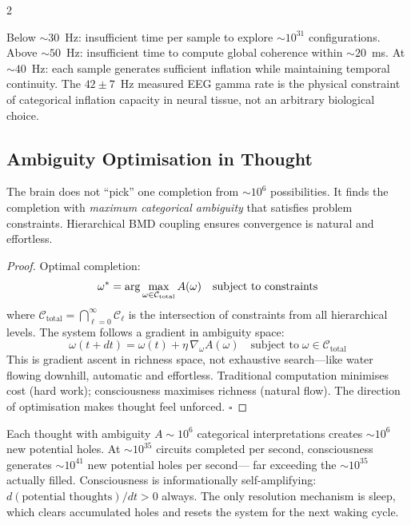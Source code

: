 \begin{multicols}{2}
\begin{corollary}
\label{cor:frame_rate}
Below $\sim30$~Hz: insufficient time per sample to explore $\sim10^{31}$
configurations.  Above $\sim50$~Hz: insufficient time to compute global
coherence within $\sim20$~ms.  At $\sim40$~Hz: each sample generates
sufficient inflation while maintaining temporal continuity.  The $42\pm7$~Hz
measured EEG gamma rate is the physical constraint of categorical inflation
capacity in neural tissue, not an arbitrary biological choice.
\end{corollary}

\subsection{Ambiguity Optimisation in Thought}
\label{ssec:ambiguity}

\begin{theorem}
\label{thm:ambiguity_optimization}
The brain does not ``pick'' one completion from $\sim10^6$ possibilities.
It finds the completion with \emph{maximum categorical ambiguity} that
satisfies problem constraints.  Hierarchical BMD coupling ensures convergence
is natural and effortless.
\end{theorem}

\begin{proof}
Optimal completion:
\begin{equation}
\omega^* = \arg\max_{\omega \in \mathcal{C}_{\text{total}}} A(\omega)
\quad\text{subject to constraints}
\label{eq:ambiguity_optimisation}
\end{equation}
where $\mathcal{C}_{\text{total}} = \bigcap_{\ell=0}^{\infty} \mathcal{C}_\ell$
is the intersection of constraints from all hierarchical levels.  The system
follows a gradient in ambiguity space:
\begin{equation}
\omega(t+dt) = \omega(t) + \eta\,\nabla_\omega A(\omega)
\quad\text{subject to}\;\omega\in\mathcal{C}_{\text{total}}
\end{equation}
This is gradient ascent in richness space, not exhaustive search---like
water flowing downhill, automatic and effortless.  Traditional computation
minimises cost (hard work); consciousness maximises richness (natural flow).
The direction of optimisation makes thought feel unforced. $\square$
\end{proof}

\begin{corollary}
\label{cor:self_perpetuation}
Each thought with ambiguity $A\sim10^6$ categorical interpretations creates
$\sim10^6$ new potential holes.  At $\sim10^{35}$ circuits completed per
second, consciousness generates $\sim10^{41}$ new potential holes per second---
far exceeding the $\sim10^{35}$ actually filled.  Consciousness is
informationally self-amplifying:
$d(\text{potential thoughts})/dt > 0$ always.
The only resolution mechanism is sleep, which clears accumulated holes
and resets the system for the next waking cycle.
\end{corollary}


\end{multicols}
